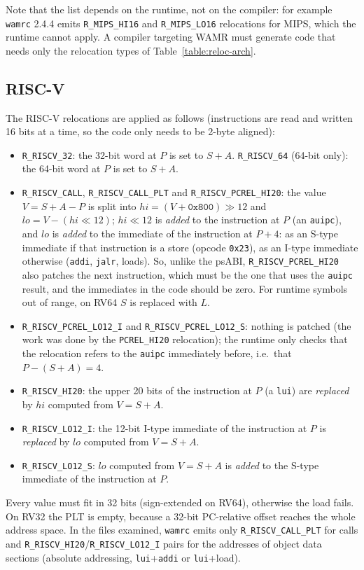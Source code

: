 \documentclass{article}
\begin{document}
Note that the list depends on the runtime, not on the compiler: for example \texttt{wamrc} 2.4.4 emits \verb|R_MIPS_HI16| and \verb|R_MIPS_LO16| relocations for MIPS, which the runtime cannot apply.
A compiler targeting WAMR must generate code that needs only the relocation types of Table~\ref{table:reloc-arch}.

\subsection{RISC-V}
The RISC-V relocations are applied as follows (instructions are read and written 16 bits at a time, so the code only needs to be 2-byte aligned):
\begin{itemize}
    \item \verb|R_RISCV_32|: the 32-bit word at $P$ is set to $S+A$. \verb|R_RISCV_64| (64-bit only): the 64-bit word at $P$ is set to $S+A$.
    \item \verb|R_RISCV_CALL|, \verb|R_RISCV_CALL_PLT| and \verb|R_RISCV_PCREL_HI20|: the value $V = S + A - P$ is split into $\mathit{hi} = (V + \texttt{0x800}) \gg 12$ and $\mathit{lo} = V - (\mathit{hi} \ll 12)$; $\mathit{hi} \ll 12$ is \emph{added} to the instruction at $P$ (an \verb|auipc|), and $\mathit{lo}$ is \emph{added} to the immediate of the instruction at $P+4$: as an S-type immediate if that instruction is a store (opcode \verb|0x23|), as an I-type immediate otherwise (\verb|addi|, \verb|jalr|, loads).
        So, unlike the psABI, \verb|R_RISCV_PCREL_HI20| also patches the next instruction, which must be the one that uses the \verb|auipc| result, and the immediates in the code should be zero.
        For runtime symbols out of range, on RV64 $S$ is replaced with $L$.
    \item \verb|R_RISCV_PCREL_LO12_I| and \verb|R_RISCV_PCREL_LO12_S|: nothing is patched (the work was done by the \verb|PCREL_HI20| relocation); the runtime only checks that the relocation refers to the \verb|auipc| immediately before, i.e.\ that $P - (S + A) = 4$.
    \item \verb|R_RISCV_HI20|: the upper 20 bits of the instruction at $P$ (a \verb|lui|) are \emph{replaced} by $\mathit{hi}$ computed from $V = S+A$.
    \item \verb|R_RISCV_LO12_I|: the 12-bit I-type immediate of the instruction at $P$ is \emph{replaced} by $\mathit{lo}$ computed from $V = S+A$.
    \item \verb|R_RISCV_LO12_S|: $\mathit{lo}$ computed from $V = S+A$ is \emph{added} to the S-type immediate of the instruction at $P$.
\end{itemize}
Every value must fit in 32 bits (sign-extended on RV64), otherwise the load fails.
On RV32 the PLT is empty, because a 32-bit PC-relative offset reaches the whole address space.
In the files examined, \texttt{wamrc} emits only \verb|R_RISCV_CALL_PLT| for calls and \verb|R_RISCV_HI20|/\verb|R_RISCV_LO12_I| pairs for the addresses of object data sections (absolute addressing, \verb|lui|+\verb|addi| or \verb|lui|+load).
\end{document}
